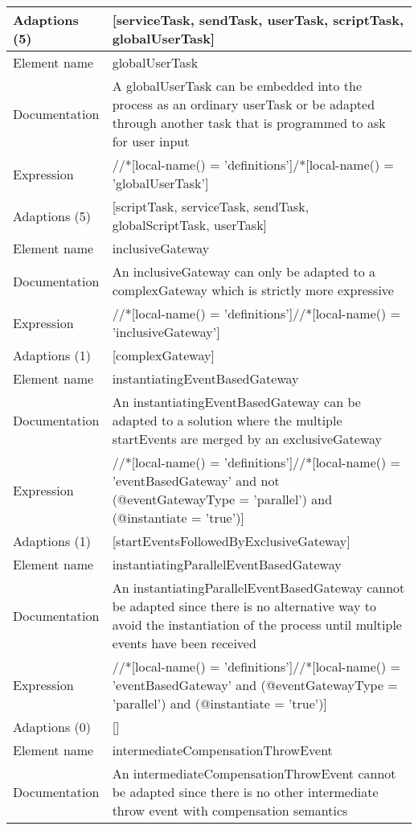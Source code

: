 \begin{center}
\begin{tiny}
\begin{longtable}{p{}|p{}}
\myrowcolour
Adaptions (5) & [serviceTask, sendTask, userTask, scriptTask, globalUserTask]\\
\midrule
Element name & globalUserTask\\
\myrowcolour
Documentation &A globalUserTask can be embedded into the process as an ordinary userTask or be adapted through another task that is programmed to ask for user input\\
Expression & //*[local-name() = 'definitions']/*[local-name() = 'globalUserTask']\\
\myrowcolour
Adaptions (5) & [scriptTask, serviceTask, sendTask, globalScriptTask, userTask]\\
\midrule
Element name & inclusiveGateway\\
\myrowcolour
Documentation &An inclusiveGateway can only be adapted to a complexGateway which is strictly more expressive\\
Expression & //*[local-name() = 'definitions']//*[local-name() = 'inclusiveGateway']\\
\myrowcolour
Adaptions (1) & [complexGateway]\\
\midrule
Element name & instantiatingEventBasedGateway\\
\myrowcolour
Documentation &An instantiatingEventBasedGateway can be adapted to a solution where the multiple startEvents are merged by an exclusiveGateway\\
Expression & //*[local-name() = 'definitions']//*[local-name() = 'eventBasedGateway' and not (@eventGatewayType = 'parallel') and (@instantiate = 'true')]\\
\myrowcolour
Adaptions (1) & [startEventsFollowedByExclusiveGateway]\\
\midrule
Element name & instantiatingParallelEventBasedGateway\\
\myrowcolour
Documentation &An instantiatingParallelEventBasedGateway cannot be adapted since there is no alternative way to avoid the instantiation of the process until multiple events have been received\\
Expression & //*[local-name() = 'definitions']//*[local-name() = 'eventBasedGateway' and (@eventGatewayType = 'parallel') and (@instantiate = 'true')]\\
\myrowcolour
Adaptions (0) & []\\
\midrule
Element name & intermediateCompensationThrowEvent\\
\myrowcolour
Documentation &An intermediateCompensationThrowEvent cannot be adapted since there is no other intermediate throw event with compensation semantics\\

\end{longtable}
\end{tiny}
\end{center}
